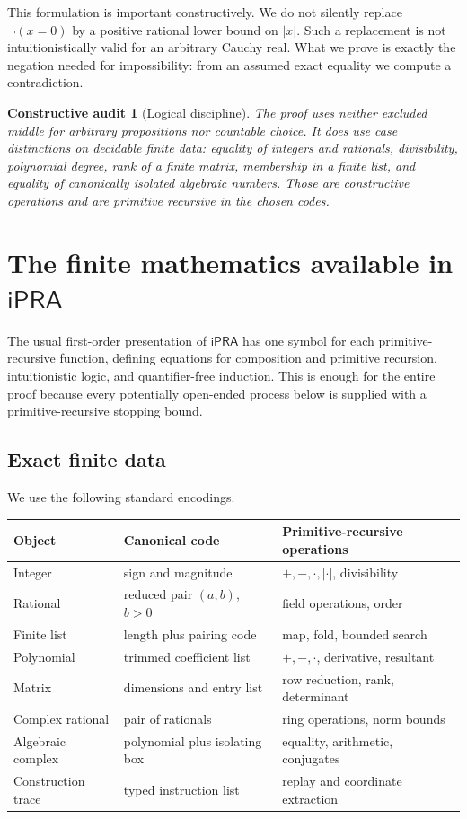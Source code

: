 \documentclass[11pt]{article}
\newtheorem{audit}[theorem]{Constructive audit}
\newcommand{\ipra}{\mathsf{iPRA}}
\begin{document}
This formulation is important constructively.  We do not silently replace $\neg(x=0)$ by a positive rational lower bound on $|x|$.  Such a replacement is not intuitionistically valid for an arbitrary Cauchy real.  What we prove is exactly the negation needed for impossibility: from an assumed exact equality we compute a contradiction.

\begin{audit}[Logical discipline]
The proof uses neither excluded middle for arbitrary propositions nor countable choice.  It does use case distinctions on decidable finite data: equality of integers and rationals, divisibility, polynomial degree, rank of a finite matrix, membership in a finite list, and equality of canonically isolated algebraic numbers.  Those are constructive operations and are primitive recursive in the chosen codes.
\end{audit}

\section{The finite mathematics available in $\ipra$}

The usual first-order presentation of $\ipra$ has one symbol for each primitive-recursive function, defining equations for composition and primitive recursion, intuitionistic logic, and quantifier-free induction.  This is enough for the entire proof because every potentially open-ended process below is supplied with a primitive-recursive stopping bound.

\subsection{Exact finite data}

We use the following standard encodings.

\begin{center}
\begin{tabular}{@{}lll@{}}
\toprule
Object & Canonical code & Primitive-recursive operations \\
\midrule
Integer & sign and magnitude & $+,-,\cdot,|\cdot|$, divisibility \\
Rational & reduced pair $(a,b)$, $b>0$ & field operations, order \\
Finite list & length plus pairing code & map, fold, bounded search \\
Polynomial & trimmed coefficient list & $+,-,\cdot$, derivative, resultant \\
Matrix & dimensions and entry list & row reduction, rank, determinant \\
Complex rational & pair of rationals & ring operations, norm bounds \\
Algebraic complex & polynomial plus isolating box & equality, arithmetic, conjugates \\
Construction trace & typed instruction list & replay and coordinate extraction \\
\bottomrule
\end{tabular}
\end{center}
\end{document}
